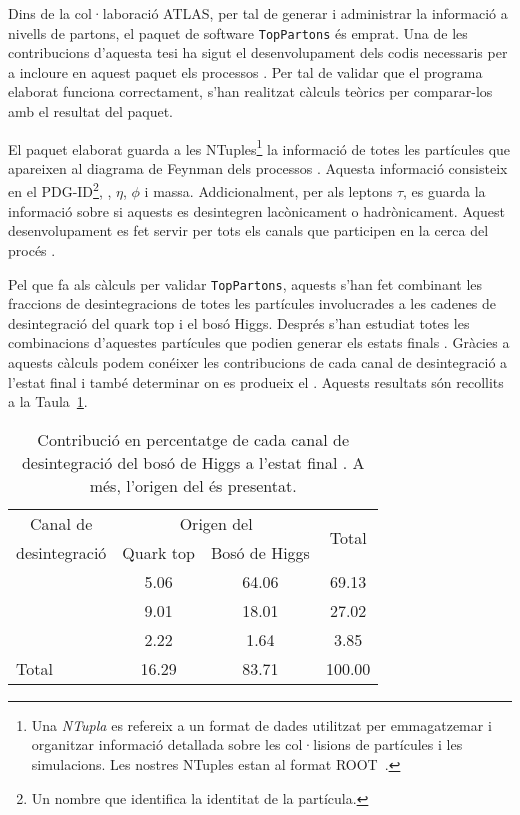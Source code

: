 Dins de la col·laboració ATLAS, per tal de generar i administrar la informació a nivells de partons, el
paquet de software \texttt{TopPartons} és emprat. Una de les contribucions %
d'aquesta tesi ha sigut el desenvolupament dels codis necessaris per a incloure en aquest paquet els processos \tHq.
Per tal de validar que el programa elaborat funciona correctament, s'han realitzat càlculs teòrics per comparar-los amb el resultat
del paquet.

El paquet elaborat guarda a les NTuples\footnote{Una \textit{NTupla} es refereix a un format de dades utilitzat
per emmagatzemar i organitzar informació detallada sobre les col·lisions de partícules i les simulacions. 
Les nostres NTuples estan al format ROOT~\cite{Brun:1997pa}.}
la informació de totes les partícules que apareixen al diagrama de Feynman dels processos \tHq.
Aquesta informació consisteix en el PDG-ID\footnote{Un nombre que identifica la identitat de la partícula.}, \pT, $\eta$, $\phi$ i massa. Addicionalment, per als leptons $\tau$,
es guarda la informació sobre si aquests es desintegren lacònicament o hadrònicament.
Aquest desenvolupament es fet servir per tots els canals que participen en la cerca del procés \tHq.

Pel que fa als càlculs per validar \texttt{TopPartons}, aquests s'han fet combinant les fraccions de desintegracions
de totes les partícules involucrades a les cadenes de desintegració del quark top i el bosó Higgs. Després s'han estudiat
totes les combinacions d'aquestes partícules que podien generar els estats finals \dileptau. Gràcies a aquests càlculs podem
conéixer les contribucions de cada canal de desintegració a l'estat final i també determinar on es produeix el \tauhad.
Aquests resultats són recollits a la Taula~\ref{tab:ResumChaptH:TruthSummary}.


\begin{table}[h]
\centering
\begin{adjustbox}{max width=0.95\textwidth}
\begin{tabular}{l|cc|c}
\toprule
       \multicolumn{1}{c|}{Canal de} 	& \multicolumn{2}{c|}{Origen del \tauhad} &    \multirow{2}{*}{Total}     \\ \cline{2-3}
      \multicolumn{1}{c|}{desintegració}  			& Quark  top      				& Bosó de Higgs       &   \\ \midrule
\Htautau 	& 5.06      					& 64.06        		      			& 69.13	\\
\HWW    	& 9.01         				& 18.01              				& 27.02 	\\
\HZZ    	& 2.22          				& 1.64               				& 3.85   	\\ 
\midrule
Total  	& 16.29           				& 83.71              				& 100.00 	\\
\bottomrule
\end{tabular}
\end{adjustbox}
\caption{Contribució en percentatge de cada canal de desintegració del bosó de Higgs a l'estat final \dileptau. 
A més, l'origen del \tauhad és presentat.}
\label{tab:ResumChaptH:TruthSummary}
\end{table}

